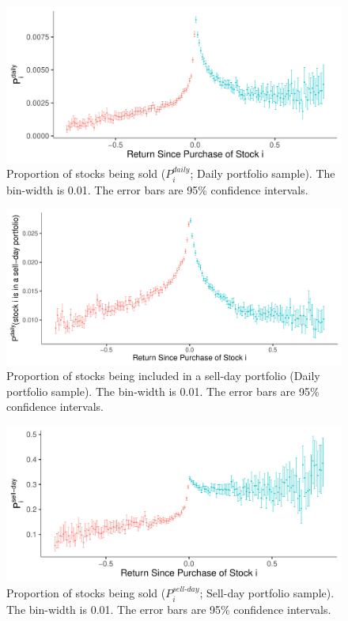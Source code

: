 \documentclass[11pt, a4paper]{article}
\begin{document}
\begin{appendices}



\begin{figure}[H]
	\centering
	\includegraphics[width=0.8\columnwidth]{barc_schedule_daily_all_3.pdf}
	\caption{Proportion of stocks being sold ($P^{daily}_{i}$; Daily portfolio sample). The bin-width is 0.01. The error bars are 95\% confidence intervals.}
	\label{figure:prop_all}
\end{figure}


\begin{figure}[H]
	\centering
	\includegraphics[width=0.8\columnwidth]{barc_port_sell_3.pdf}
	\caption{\small Proportion of stocks being included in a sell-day portfolio (Daily portfolio sample). The bin-width is 0.01. The error bars are 95\% confidence intervals.}
	\label{figure:prop_sell_day}
\end{figure}



\begin{figure}[H]
	\centering
	\includegraphics[width=0.8\columnwidth]{barc_schedule_sell_day_3.pdf}
	\caption{\small Proportion of stocks being sold ($P^{sell\mbox{-}day}_{i}$; Sell-day portfolio sample). The bin-width is 0.01. The error bars are 95\% confidence intervals.}
	\label{figure:prop_sell_days}
\end{figure}


\end{appendices}
\end{document}
